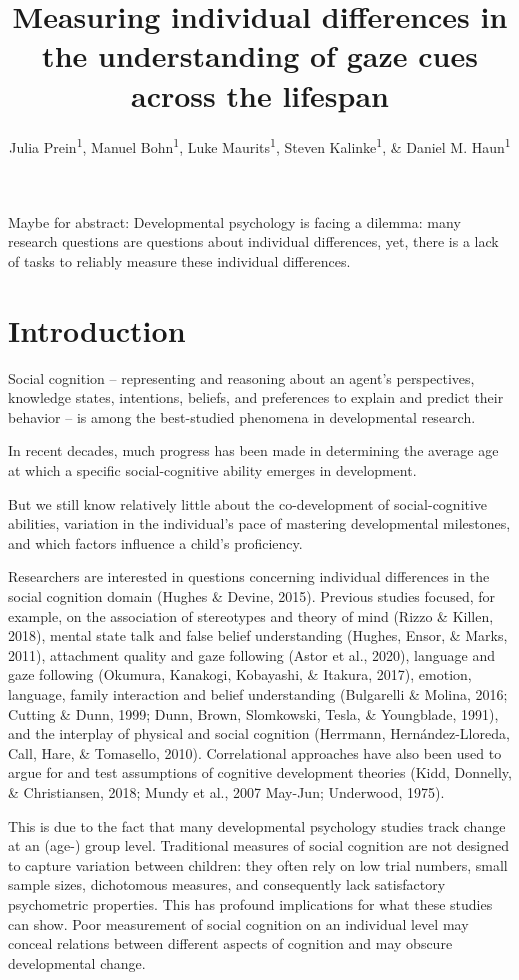\documentclass[
  man,floatsintext]{apa6}
\title{Measuring individual differences in the understanding of gaze cues across the lifespan}
\author{Julia Prein\textsuperscript{1}, Manuel Bohn\textsuperscript{1}, Luke Maurits\textsuperscript{1}, Steven Kalinke\textsuperscript{1}, \& Daniel M. Haun\textsuperscript{1}}
\date{}
\affiliation{\vspace{0.5cm}\textsuperscript{1} Department of Comparative Cultural Psychology, Max Planck Institute for Evolutionary Anthropology, Leipzig, Germany}
\begin{document}
\maketitle

Maybe for abstract: Developmental psychology is facing a dilemma: many research questions are questions about individual differences, yet, there is a lack of tasks to reliably measure these individual differences.

\hypertarget{introduction}{%
\section{Introduction}\label{introduction}}

Social cognition -- representing and reasoning about an agent's perspectives, knowledge states, intentions, beliefs, and preferences to explain and predict their behavior -- is among the best-studied phenomena in developmental research.

In recent decades, much progress has been made in determining the average age at which a specific social-cognitive ability emerges in development.

But we still know relatively little about the co-development of social-cognitive abilities, variation in the individual's pace of mastering developmental milestones, and which factors influence a child's proficiency.

Researchers are interested in questions concerning individual differences in the social cognition domain (Hughes \& Devine, 2015). Previous studies focused, for example, on the association of stereotypes and theory of mind (Rizzo \& Killen, 2018), mental state talk and false belief understanding (Hughes, Ensor, \& Marks, 2011), attachment quality and gaze following (Astor et al., 2020), language and gaze following (Okumura, Kanakogi, Kobayashi, \& Itakura, 2017), emotion, language, family interaction and belief understanding (Bulgarelli \& Molina, 2016; Cutting \& Dunn, 1999; Dunn, Brown, Slomkowski, Tesla, \& Youngblade, 1991), and the interplay of physical and social cognition (Herrmann, Hernández-Lloreda, Call, Hare, \& Tomasello, 2010). Correlational approaches have also been used to argue for and test assumptions of cognitive development theories (Kidd, Donnelly, \& Christiansen, 2018; Mundy et al., 2007 May-Jun; Underwood, 1975).

This is due to the fact that many developmental psychology studies track change at an (age-) group level.
Traditional measures of social cognition are not designed to capture variation between children:
they often rely on low trial numbers, small sample sizes, dichotomous measures, and consequently lack satisfactory psychometric properties.
This has profound implications for what these studies can show. Poor measurement of social cognition on an individual level may conceal relations between different aspects of cognition and may obscure developmental change.
\end{document}
